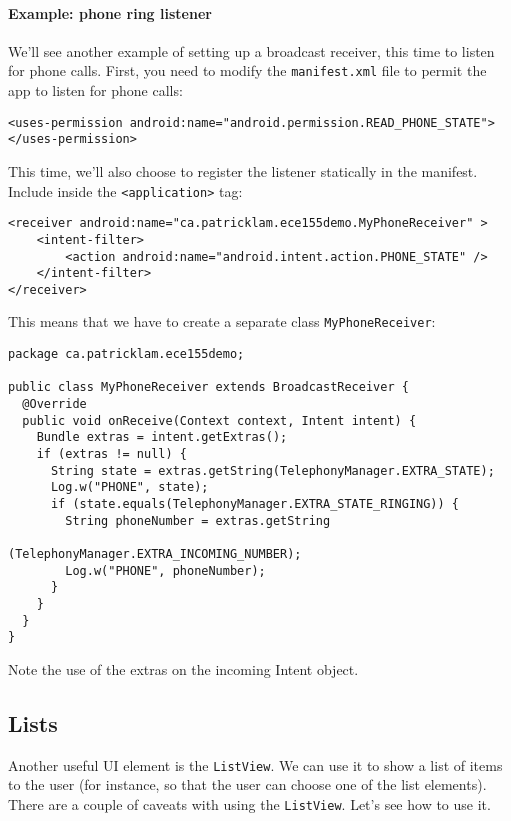 \paragraph{Example: phone ring listener}
We'll see another example of setting up a broadcast receiver, this time to listen
for phone calls. First, you need to modify the {\tt manifest.xml} file to permit
the app to listen for phone calls:

\begin{lstlisting}
<uses-permission android:name="android.permission.READ_PHONE_STATE">
</uses-permission>
\end{lstlisting}

This time, we'll also choose to register the listener statically in
the manifest. Include inside the \verb+<application>+ tag:

\begin{lstlisting}
<receiver android:name="ca.patricklam.ece155demo.MyPhoneReceiver" >
    <intent-filter>
        <action android:name="android.intent.action.PHONE_STATE" />
    </intent-filter>
</receiver>
\end{lstlisting}
This means that we have to create a separate class {\tt MyPhoneReceiver}:
{\small \begin{lstlisting}
package ca.patricklam.ece155demo;

public class MyPhoneReceiver extends BroadcastReceiver {
  @Override
  public void onReceive(Context context, Intent intent) {
    Bundle extras = intent.getExtras();
    if (extras != null) {
      String state = extras.getString(TelephonyManager.EXTRA_STATE);
      Log.w("PHONE", state);
      if (state.equals(TelephonyManager.EXTRA_STATE_RINGING)) {
        String phoneNumber = extras.getString
                               (TelephonyManager.EXTRA_INCOMING_NUMBER);
        Log.w("PHONE", phoneNumber);
      }
    }
  }
}
\end{lstlisting}}
Note the use of the extras on the incoming Intent object.


\subsection*{Lists}
Another useful UI element is the {\tt ListView}. We can use it to show 
a list of items to the user (for instance, so that the user can choose
one of the list elements). There are a couple of caveats with using the
{\tt ListView}. Let's see how to use it.

